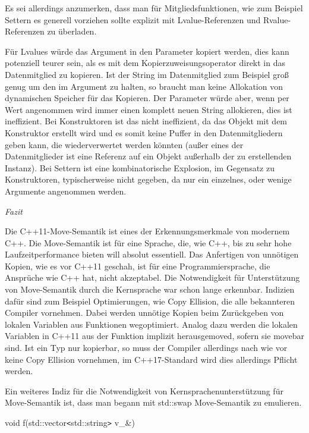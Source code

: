 \documentclass{article}
\begin{document}
Es sei allerdings anzumerken, dass man für Mitgliedsfunktionen, wie zum Beispiel 
Settern es generell vorziehen sollte explizit mit Lvalue-Referenzen und Rvalue-Referenzen 
zu überladen.

Für Lvalues würde das Argument in den Parameter kopiert werden, dies kann potenziell 
teurer sein, als es mit dem Kopierzuweisungsoperator direkt in das Datenmitglied 
zu kopieren. Ist der String im Datenmitglied zum Beispiel groß genug um den im 
Argument zu halten, so braucht man keine Allokation von dynamischen Speicher für 
das Kopieren. Der Parameter würde aber, wenn per Wert angenommen wird immer einen 
komplett neuen String allokieren, dies ist ineffizient. Bei Konstruktoren ist das 
nicht ineffizient, da das Objekt mit dem Konstruktor erstellt wird und es somit 
keine Puffer in den Datenmitgliedern geben kann, die wiederverwertet werden könnten 
(außer eines der Datenmitglieder ist eine Referenz auf ein Objekt außerhalb der 
zu erstellenden Instanz). Bei Settern ist eine kombinatorische Explosion, im Gegensatz 
zu Konstruktoren, typischerweise nicht gegeben, da nur ein einzelnes, oder wenige 
Argumente angenommen werden.

\vspace{38pt}
\emph{Fazit}

Die C++11-Move-Semantik ist eines der Erkennungsmerkmale von modernem C++. Die 
Move-Semantik ist für eine Sprache, die, wie C++, bis zu sehr hohe Laufzeitperformance 
bieten will absolut essentiell. Das Anfertigen von unnötigen Kopien, wie es vor 
C++11 geschah, ist für eine Programmiersprache, die Ansprüche wie C++ hat, nicht 
akzeptabel. Die Notwendigkeit für Unterstützung von Move-Semantik durch die Kernsprache 
war schon lange erkennbar. Indizien dafür sind zum Beispiel Optimierungen, wie 
Copy Ellision, die alle bekannteren Compiler vornehmen. Dabei werden unnötige 
Kopien beim Zurückgeben von lokalen Variablen aus Funktionen wegoptimiert. Analog 
dazu werden die lokalen Variablen in C++11 aus der Funktion implizit herausgemoved, 
sofern sie movebar sind. Ist ein Typ nur kopierbar, so muss der Compiler allerdings 
nach wie vor keine Copy Ellision vornehmen, im C++17-Standard wird dies allerdings 
Pflicht werden. 

Ein weiteres Indiz für die Notwendigkeit von Kernsprachenunterstützung für Move-Semantik 
ist, dass man begann mit std::swap Move-Semantik zu emulieren.

\vspace{12pt}
void f(std::vector\texttt{<}std::string\texttt{>} v\_\&)
\end{document}
